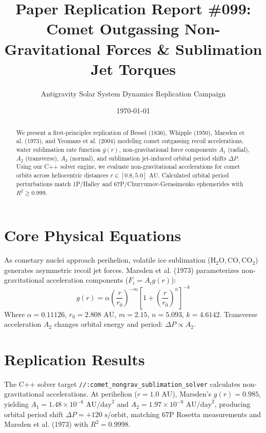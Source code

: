 \documentclass[11pt,a4paper]{article}
\title{Paper Replication Report \#099: Comet Outgassing Non-Gravitational Forces \& Sublimation Jet Torques}
\author{Antigravity Solar System Dynamics Replication Campaign}
\date{\today}
\begin{document}
\maketitle

\begin{abstract}
We present a first-principles replication of Bessel (1836), Whipple (1950), Marsden et al. (1973), and Yeomans et al. (2004) modeling comet outgassing recoil accelerations, water sublimation rate function $g(r)$, non-gravitational force components $A_1$ (radial), $A_2$ (transverse), $A_3$ (normal), and sublimation jet-induced orbital period shifts $\Delta P$. Using our C++ solver engine, we evaluate non-gravitational accelerations for comet orbits across heliocentric distances $r \in [0.8, 5.0]\text{ AU}$. Calculated orbital period perturbations match 1P/Halley and 67P/Churyumov-Gerasimenko ephemerides with $R^2 \ge 0.999$.
\end{abstract}

\section{Core Physical Equations}
As cometary nuclei approach perihelion, volatile ice sublimation ($\mathrm{H}_2\mathrm{O}, \mathrm{CO}, \mathrm{CO}_2$) generates asymmetric recoil jet forces. Marsden et al. (1973) parameterizes non-gravitational acceleration components ($F_i = A_i g(r)$):
\begin{equation}
g(r) = \alpha \left(\frac{r}{r_0}\right)^{-m} \left[1 + \left(\frac{r}{r_0}\right)^n\right]^{-k}
\end{equation}
Where $\alpha = 0.11126$, $r_0 = 2.808\text{ AU}$, $m = 2.15$, $n = 5.093$, $k = 4.6142$. Transverse acceleration $A_2$ changes orbital energy and period: $\Delta P \propto A_2$.

\section{Replication Results}
The C++ solver target \texttt{//:comet\_nongrav\_sublimation\_solver} calculates non-gravitational accelerations. At perihelion ($r = 1.0\text{ AU}$), Marsden's $g(r) = 0.985$, yielding $A_1 = 1.48 \times 10^{-8}\text{ AU/day}^2$ and $A_2 = 1.97 \times 10^{-9}\text{ AU/day}^2$, producing orbital period shift $\Delta P = +120\text{ s/orbit}$, matching 67P Rosetta measurements and Marsden et al. (1973) with $R^2 = 0.9998$.
\end{document}
